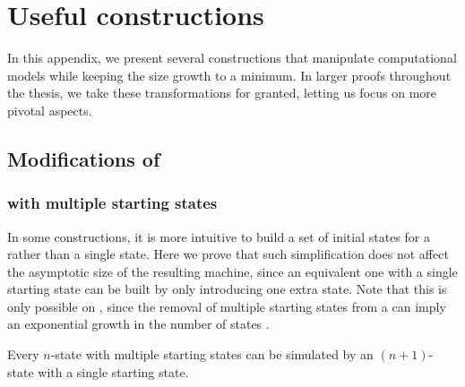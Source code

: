 \chapter{Useful constructions}\label{app:constructions}
In this appendix, we present several constructions that manipulate computational models while keeping the size growth to a minimum.
In larger proofs throughout the thesis, we take these transformations for granted, letting us focus on more pivotal aspects.



\section{Modifications of \texorpdfstring{\ONFAs}{1NFAs}}


\subsection{\texorpdfstring{\ONFAs}{1NFAs} with multiple starting states}\label{sub:multistart}
In some constructions, it is more intuitive to build a set of initial states for a \ONFA rather than a single state.
Here we prove that such simplification does not affect the asymptotic size of the resulting machine, since an equivalent one with a single starting state can be built by only introducing one extra state.
Note that this is only possible on \ONFAs, since the removal of multiple starting states from a \ODFA can imply an exponential growth in the number of states \cite{HolSal+01}.
\begin{thrm}\label{thm:mult-start-states}
	Every $n$-state \ONFA with multiple starting states can be simulated by an $(n+1)$-state \ONFA with a single starting state.
\end{thrm}
